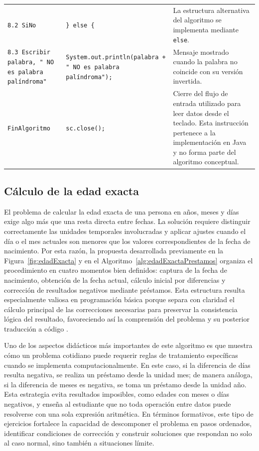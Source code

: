 \documentclass[12pt,twoside]{book}
\begin{document}
\begin{landscape}
\begin{longtable}{p{6cm} p{6cm} p{7cm}}
							\texttt{8.2 SiNo}
							&
							\texttt{\} else \{}
							&
							La estructura alternativa del algoritmo se implementa mediante \texttt{else}. \\
							
							
							\texttt{8.3 Escribir palabra, " NO es palabra palíndroma"}
							&
							\texttt{System.out.println(palabra + " NO es palabra palíndroma");}
							&
							Mensaje mostrado cuando la palabra no coincide con su versión invertida. \\
							
							\texttt{FinAlgoritmo}
							&
							\texttt{sc.close();}
							&
							Cierre del flujo de entrada utilizado para leer datos desde el teclado. Esta instrucción pertenece a la implementación en Java y no forma parte del algoritmo conceptual. \\
							
						\end{longtable}
						
					\end{landscape}
					
				\subsection{Cálculo de la edad exacta}
				\noindent
					El problema de calcular la edad exacta de una persona en años, meses y días exige algo más que una resta directa entre fechas. La solución requiere distinguir correctamente las unidades temporales involucradas y aplicar ajustes cuando el día o el mes actuales son menores que los valores correspondientes de la fecha de nacimiento. Por esta razón, la propuesta desarrollada previamente en la Figura~\ref{fig:edadExacta} y en el Algoritmo~\ref{alg:edadExactaPrestamos} organiza el procedimiento en cuatro momentos bien definidos: captura de la fecha de nacimiento, obtención de la fecha actual, cálculo inicial por diferencias y corrección de resultados negativos mediante préstamos. Esta estructura resulta especialmente valiosa en programación básica porque separa con claridad el cálculo principal de las correcciones necesarias para preservar la consistencia lógica del resultado, favoreciendo así la comprensión del problema y su posterior traducción a código \cite{Pressman2019Software,Sommerville2015Software}.
					
					Uno de los aspectos didácticos más importantes de este algoritmo es que muestra cómo un problema cotidiano puede requerir reglas de tratamiento específicas cuando se implementa computacionalmente. En este caso, si la diferencia de días resulta negativa, se realiza un préstamo desde la unidad mes; de manera análoga, si la diferencia de meses es negativa, se toma un préstamo desde la unidad año. Esta estrategia evita resultados imposibles, como edades con meses o días negativos, y enseña al estudiante que no toda operación entre datos puede resolverse con una sola expresión aritmética. En términos formativos, este tipo de ejercicios fortalece la capacidad de descomponer el problema en pasos ordenados, identificar condiciones de corrección y construir soluciones que respondan no solo al caso normal, sino también a situaciones límite.
					
\end{document}
